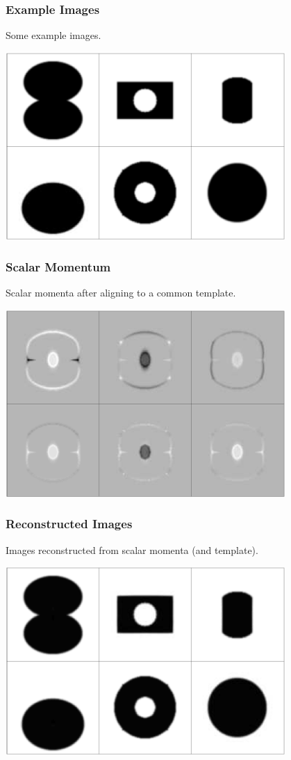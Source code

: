 
\begin{frame}
\frametitle{Example Images}
Some example images.
\begin{center}
\includegraphics[width=0.8\textwidth]{original}
\end{center}
\end{frame}


\begin{frame}
\frametitle{Scalar Momentum}
Scalar momenta after aligning to a common template.
\begin{center}
\includegraphics[width=0.8\textwidth]{alpha}
\end{center}
\end{frame}


\begin{frame}
\frametitle{Reconstructed Images}
Images reconstructed from scalar momenta (and template).
\begin{center}
\includegraphics[width=0.8\textwidth]{reconstructed}
\end{center}
\end{frame}



